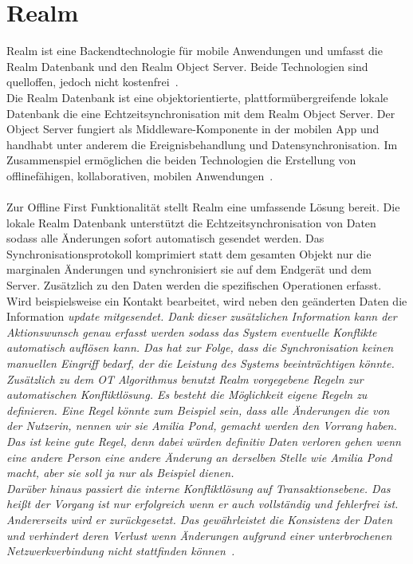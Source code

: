 \section{\label{sub:realm}Realm}
Realm ist eine Backendtechnologie für mobile Anwendungen und umfasst die Realm Datenbank und den Realm Object Server. Beide Technologien sind quelloffen, jedoch nicht kostenfrei~\cite{realm}.\\
Die Realm Datenbank ist eine objektorientierte, plattformübergreifende lokale Datenbank die eine Echtzeitsynchronisation mit dem Realm Object Server.
Der Object Server fungiert als \gls{Middleware}-Komponente in der mobilen \gls{App} und handhabt unter anderem die Ereignisbehandlung und Datensynchronisation. Im Zusammenspiel ermöglichen die beiden Technologien die Erstellung von offlinefähigen, kollaborativen, mobilen Anwendungen~\cite{realm_whitepaper}.\\\\
Zur Offline First Funktionalität stellt Realm eine umfassende Lösung bereit.
Die lokale Realm Datenbank unterstützt die Echtzeitsynchronisation von Daten sodass alle Änderungen sofort automatisch gesendet werden. Das Synchronisationsprotokoll komprimiert statt dem gesamten Objekt nur die marginalen Änderungen und synchronisiert sie auf dem Endgerät und dem Server. Zusätzlich zu den Daten werden die spezifischen Operationen erfasst. 
Wird beispielsweise ein Kontakt bearbeitet, wird neben den geänderten Daten die Information \it{update} mitgesendet.
Dank dieser zusätzlichen Information kann der Aktionswunsch genau erfasst werden sodass das System eventuelle Konflikte automatisch auflösen kann. Das hat zur Folge, dass die Synchronisation keinen manuellen Eingriff bedarf, der die Leistung des Systems beeinträchtigen könnte.
Zusätzlich zu dem \gls{OT} Algorithmus benutzt Realm vorgegebene Regeln zur automatischen Konfliktlösung. Es besteht die Möglichkeit eigene Regeln zu definieren. Eine Regel könnte zum Beispiel sein, dass alle Änderungen die von der Nutzerin, nennen wir sie Amilia Pond, gemacht werden den Vorrang haben. Das ist keine gute Regel, denn dabei würden definitiv Daten verloren gehen wenn eine andere Person eine andere Änderung an derselben Stelle wie Amilia Pond macht, aber sie soll ja nur als Beispiel dienen.\\
Darüber hinaus passiert die interne Konfliktlösung auf Transaktionsebene. Das heißt der Vorgang ist nur erfolgreich wenn er auch vollständig und fehlerfrei ist. Andererseits wird er zurückgesetzt. Das gewährleistet die Konsistenz der Daten und verhindert deren Verlust wenn Änderungen aufgrund einer unterbrochenen Netzwerkverbindung nicht stattfinden können~\cite{realm_offline_whitepaper}.